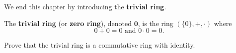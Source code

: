 We end this chapter by introducing the \textbf{trivial ring}.
\begin{definition}
    The \textbf{trivial ring} (or \textbf{zero ring}), denoted $\textbf{0}$, is the ring $(\{0\}, +, \cdot)$ where
    \[
        0 + 0 = 0 \text{ and } 0 \cdot 0 = 0.
    \]
\end{definition}
\begin{exercise}
    Prove that the trivial ring is a commutative ring with identity.
\end{exercise}
